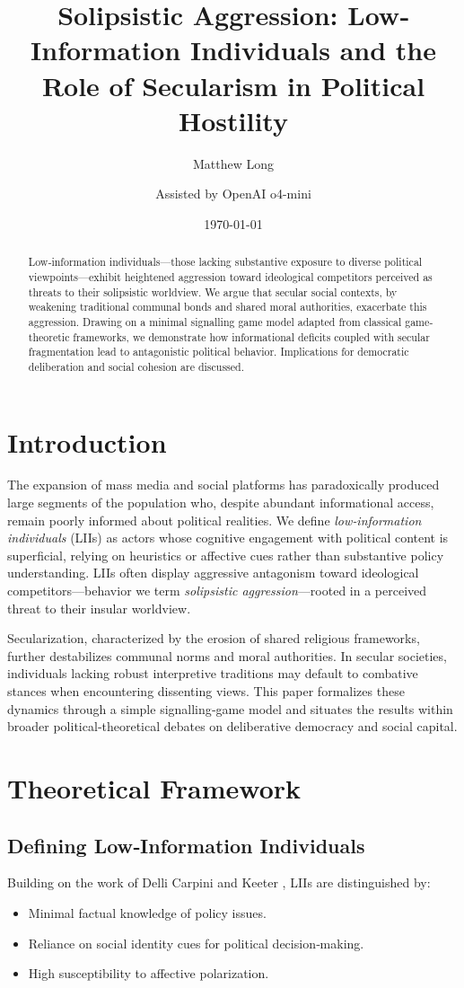 \documentclass[11pt]{article}
\title{\textbf{Solipsistic Aggression: Low‐Information Individuals and the Role of Secularism in Political Hostility}}
\author[1]{Matthew Long}
\author[2]{Assisted by OpenAI o4-mini}
\affil[1]{Yoneda AI}
\affil[2]{OpenAI}
\date{\today}
\begin{document}
\maketitle

\begin{abstract}
Low‐information individuals—those lacking substantive exposure to diverse political viewpoints—exhibit heightened aggression toward ideological competitors perceived as threats to their solipsistic worldview. We argue that secular social contexts, by weakening traditional communal bonds and shared moral authorities, exacerbate this aggression. Drawing on a minimal signalling game model adapted from classical game‐theoretic frameworks, we demonstrate how informational deficits coupled with secular fragmentation lead to antagonistic political behavior. Implications for democratic deliberation and social cohesion are discussed.
\end{abstract}

\section{Introduction}
The expansion of mass media and social platforms has paradoxically produced large segments of the population who, despite abundant informational access, remain poorly informed about political realities. We define \emph{low‐information individuals} (LIIs) as actors whose cognitive engagement with political content is superficial, relying on heuristics or affective cues rather than substantive policy understanding. LIIs often display aggressive antagonism toward ideological competitors—behavior we term \emph{solipsistic aggression}—rooted in a perceived threat to their insular worldview.

Secularization, characterized by the erosion of shared religious frameworks, further destabilizes communal norms and moral authorities. In secular societies, individuals lacking robust interpretive traditions may default to combative stances when encountering dissenting views. This paper formalizes these dynamics through a simple signalling‐game model and situates the results within broader political‐theoretical debates on deliberative democracy and social capital.

\section{Theoretical Framework}
\subsection{Defining Low‐Information Individuals}
Building on the work of Delli Carpini and Keeter \cite{delli_capini_info}, LIIs are distinguished by:
\begin{itemize}
  \item Minimal factual knowledge of policy issues.
  \item Reliance on social identity cues for political decision‐making.
  \item High susceptibility to affective polarization.
\end{itemize}
\end{document}
